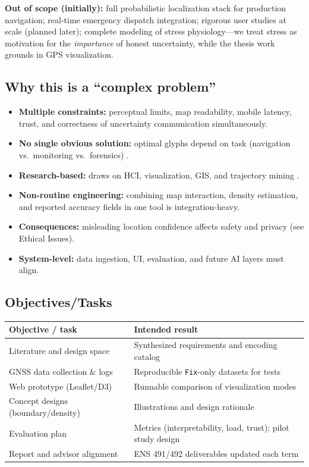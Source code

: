 \documentclass[12pt,a4paper]{article}
\begin{document}
\textbf{Out of scope (initially):} full probabilistic localization stack for production navigation; real-time emergency dispatch integration; rigorous user studies at scale (planned later); complete modeling of stress physiology---we treat stress as motivation for the \emph{importance} of honest uncertainty, while the thesis work grounds in GPS visualization.

\subsection*{Why this is a ``complex problem''}

\begin{itemize}[leftmargin=1.5em]
    \item \textbf{Multiple constraints:} perceptual limits, map readability, mobile latency, trust, and correctness of uncertainty communication simultaneously.
    \item \textbf{No single obvious solution:} optimal glyphs depend on task (navigation vs.\ monitoring vs.\ forensics) \cite{hegarty2016where}.
    \item \textbf{Research-based:} draws on HCI, visualization, GIS, and trajectory mining \cite{Zheng2015,Sobral2019,Fadloun2022}.
    \item \textbf{Non-routine engineering:} combining map interaction, density estimation, and reported accuracy fields in one tool is integration-heavy.
    \item \textbf{Consequences:} misleading location confidence affects safety and privacy (see Ethical Issues).
    \item \textbf{System-level:} data ingestion, UI, evaluation, and future AI layers must align.
\end{itemize}

\subsection{Objectives/Tasks}

\begin{center}
\small
\begin{tabular}{@{}p{}p{}@{}}
\toprule
\textbf{Objective / task} & \textbf{Intended result} \\
\midrule
Literature and design space & Synthesized requirements and encoding catalog \\
GNSS data collection \& logs & Reproducible \texttt{Fix}-only datasets for tests \\
Web prototype (Leaflet/D3) & Runnable comparison of visualization modes \\
Concept designs (boundary/density) & Illustrations and design rationale \\
Evaluation plan & Metrics (interpretability, load, trust); pilot study design \\
Report and advisor alignment & ENS 491/492 deliverables updated each term \\
\bottomrule
\end{tabular}
\end{center}
\end{document}
